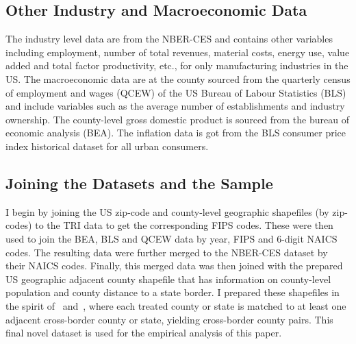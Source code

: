 \documentclass[12pt, english]{article}
\begin{document}
    \subsection{Other Industry and Macroeconomic Data}\label{subsec:other-industry-and-macroeconomic-data}
    The industry level data are from the NBER-CES and contains other variables including employment, number of total revenues, material costs, energy use, value added and total factor productivity, etc., for only manufacturing industries in the US. The macroeconomic data are at the county sourced from the quarterly census of employment and wages (QCEW) of the US Bureau of Labour Statistics (BLS) and include variables such as the average number of establishments and industry ownership. The county-level gross domestic product is sourced from the bureau of economic analysis (BEA). The inflation data is got from the BLS consumer price index historical dataset for all urban consumers.

    \subsection{Joining the Datasets and the Sample}\label{subsec:joining-the-datasets-and-the-sample}
    I begin by joining the US zip-code and county-level geographic shapefiles (by zip-codes) to the TRI data to get the corresponding FIPS codes. These were then used to join the BEA, BLS and QCEW data by year, FIPS and $6$-digit NAICS codes. The resulting data were further merged to the NBER-CES dataset by their NAICS codes. Finally, this merged data was then joined with the prepared US geographic adjacent county shapefile that has information on county-level population and county distance to a state border. I prepared these shapefiles in the spirit of~\cite{dube2010minimum} and~\cite{gopalan2021state}, where each treated county or state is matched to at least one adjacent cross-border county or state, yielding cross-border county pairs. This final novel dataset is used for the empirical analysis of this paper.
\end{document}
